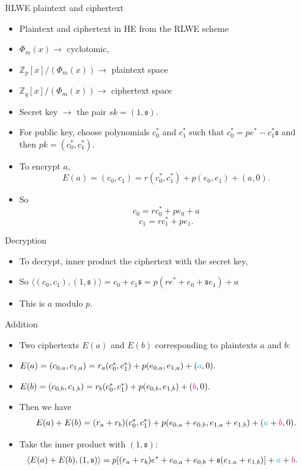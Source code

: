 \documentclass[ %
usenames,dvipsnames,
aspectratio=169,11pt]{beamer}
\newenvironment{stepitemize}{\begin{itemize}[<+->]}{\end{itemize} }
\newcommand{\Z}{\mathbb{Z}}
\begin{document}
\begin{frame}{RLWE plaintext and ciphertext}
\begin{stepitemize}
\item Plaintext and ciphertext in HE from the RLWE scheme
\item $\Phi_m(x)\rightarrow $ cyclotomic, 
\item $\Z_p[x]/(\Phi_m(x))\rightarrow$ plaintext space
\item $\Z_q[x]/(\Phi_m(x))\rightarrow $ ciphertext space
\item Secret key $\rightarrow$ the pair $sk=(1, \mathfrak{s})$.
\item For public key, choose polynomials $c_0^*$ and $c_1^*$ such that 
$c_0^*=pe^*-c_1^*\mathfrak{s}$ and then $pk=(c_0^*, c_1^*)$.
\item To encrypt $a$,
$$E(a) = (c_0,c_1) = r(c_0^*,c_1^*)+p(e_0,e_1)+(a,0).$$
\item So 
$$c_0 = rc_0^*+pe_0+a$$
$$c_1 = rc_1^*+pe_1.$$
\end{stepitemize}    
\end{frame}

\begin{frame}{Decryption}
    \begin{stepitemize}
    \item To decrypt, inner product the ciphertext with the secret key,
    \item So $\langle (c_0,c_1),(1, \mathfrak{s})\rangle = c_0+c_1\mathfrak{s} = p(re^*+e_0+\mathfrak{s}e_1)+a$
    \item This is $a$ modulo $p$. 
    \end{stepitemize}
\end{frame}

\begin{frame}{Addition}
    \begin{stepitemize}
    \item Two ciphertexts $E(a)$ and $E(b)$ corresponding to plaintexts $a$ and $b$: 
    \item $E(a) = (c_{0,a},c_{1,a}) = r_a(c_0^*,c_1^*)+p(e_{0,a},e_{1,a})+({\color{cyan}a},0).$
    \item $E(b) = (c_{0,b},c_{1,b}) = r_b(c_0^*,c_1^*)+p(e_{0,b},e_{1,b})+({\color{magenta}b},0).$
    \item Then we have 
    $$E(a)+E(b) = (r_a+r_b)(c_0^*, c_1^*)+p(e_{0,a}+e_{0,b}, e_{1,a}+e_{1,b})+({\color{cyan}a}+{\color{magenta}b},0).$$
    \item Take the inner product with $(1,\mathfrak{s})$:
    \begin{align*}
        \langle E(a)+E(b), (1, \mathfrak{s})\rangle &= p[(r_a+r_b)e^*+e_{0,a}+e_{0,b}+\mathfrak{s}(e_{1,a}+e_{1,b})]+{\color{cyan}a}+{\color{magenta}b}.  
    \end{align*}
    
    \end{stepitemize}
\end{frame}
\end{document}
